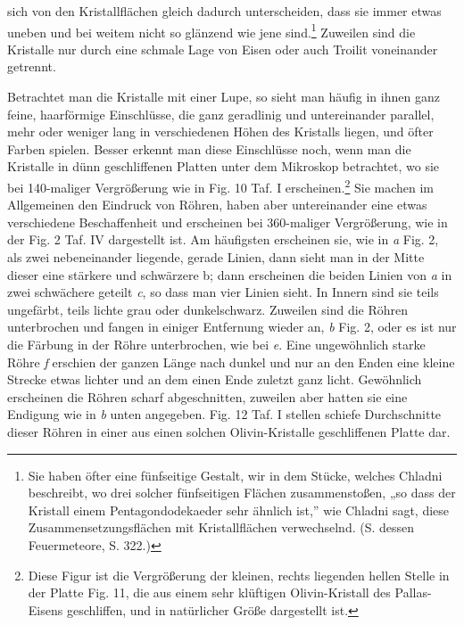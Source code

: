 \documentclass[a4paper, 11pt, oneside]{article}
\begin{document}
sich von den Kristallflächen gleich dadurch unterscheiden, dass sie immer etwas uneben und bei weitem nicht so glänzend wie jene sind.\footnote{Sie haben öfter eine fünfseitige Gestalt, wir in dem Stücke, welches Chladni beschreibt, wo drei solcher fünfseitigen Flächen zusammenstoßen, „so dass der Kristall einem Pentagondodekaeder sehr ähnlich ist,” wie Chladni sagt, diese Zusammensetzungsflächen mit Kristallflächen verwechselnd. (S. dessen Feuermeteore, S. 322.)} Zuweilen sind die Kristalle nur durch eine schmale Lage von Eisen oder auch Troilit voneinander getrennt.

Betrachtet man die Kristalle mit einer Lupe, so sieht man häufig in ihnen ganz feine, haarförmige Einschlüsse, die ganz geradlinig und untereinander parallel, mehr oder weniger lang in verschiedenen Höhen des Kristalls liegen, und öfter Farben spielen. Besser erkennt man diese Einschlüsse noch, wenn man die Kristalle in dünn geschliffenen Platten unter dem Mikroskop betrachtet, wo sie bei 140-maliger Vergrößerung wie in Fig. 10 Taf. I erscheinen.\footnote{Diese Figur ist die Vergrößerung der kleinen, rechts liegenden hellen Stelle in der Platte Fig. 11, die aus einem sehr klüftigen Olivin-Kristall des Pallas-Eisens geschliffen, und in natürlicher Größe dargestellt ist.} Sie machen im Allgemeinen den Eindruck von Röhren, haben aber untereinander eine etwas verschiedene Beschaffenheit und erscheinen bei 360-maliger Vergrößerung, wie in der Fig. 2 Taf. IV dargestellt ist. Am häufigsten erscheinen sie, wie in \emph{a} Fig. 2, als zwei nebeneinander liegende, gerade Linien, dann sieht man in der Mitte dieser eine stärkere und schwärzere b; dann erscheinen die beiden Linien von \emph{a} in zwei schwächere geteilt \emph{c}, so dass man vier Linien sieht. In Innern sind sie teils ungefärbt, teils lichte grau oder dunkelschwarz. Zuweilen sind die Röhren unterbrochen und fangen in einiger Entfernung wieder an, \emph{b} Fig. 2, oder es ist nur die Färbung in der Röhre unterbrochen, wie bei \emph{e}. Eine ungewöhnlich starke Röhre \emph{f} erschien der ganzen Länge nach dunkel und nur an den Enden eine kleine Strecke etwas lichter und an dem einen Ende zuletzt ganz licht. Gewöhnlich erscheinen die Röhren scharf abgeschnitten, zuweilen aber hatten sie eine Endigung wie in \emph{b} unten angegeben. Fig. 12 Taf. I stellen schiefe Durchschnitte dieser Röhren in einer aus einen solchen Olivin-Kristalle geschliffenen Platte dar.
\end{document}
